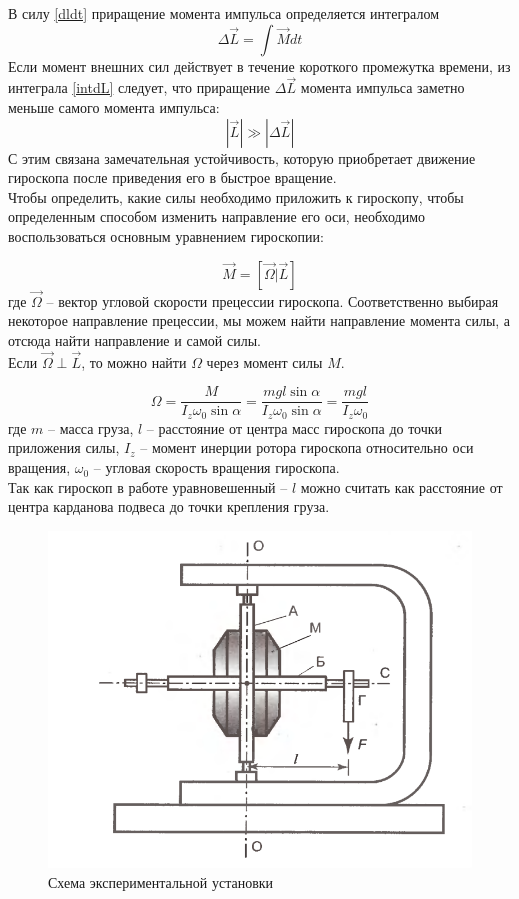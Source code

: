 \documentclass[a4paper,12pt]{article}
\begin{document}
	В силу \eqref{dldt} приращение момента импульса определяется интегралом
	\begin{equation}
		\label{intdL}
		\Delta\vec{L}=\int\vec{M}dt
	\end{equation}
	Если момент внешних сил действует в течение короткого промежутка времени, из интеграла \eqref{intdL} следует, что приращение $\Delta\vec{L}$ момента импульса заметно меньше самого момента импульса:
	\[
	|\vec{L}| \gg |\Delta\vec{L}|
	\]
	С этим связана замечательная устойчивость, которую приобретает движение гироскопа после приведения его в быстрое вращение.\\
	
	Чтобы определить, какие силы необходимо приложить к гироскопу, чтобы определенным способом изменить направление его оси, необходимо воспользоваться основным уравнением гироскопии:
	
	\begin{equation}
		\label{gyro}
		\vec{M}=[\vec{\Omega}|\vec{L}]
	\end{equation}
	где $\vec{\Omega}$ -- вектор угловой скорости прецессии гироскопа. Соответственно выбирая некоторое направление прецессии, мы можем найти направление момента силы, а отсюда найти направление и самой силы.\\
	
	Если $\vec{\Omega} \perp \vec{L}$, то можно найти $\Omega$ через момент силы $M$.
	
	\begin{equation}
		\label{Omega}
		\Omega=\frac{M}{I_z\omega_0\sin{\alpha}}=\frac{mgl\sin{\alpha}}{I_z\omega_0\sin{\alpha}}=\frac{mgl}{I_z\omega_0}
	\end{equation}
	где $m$ -- масса груза, $l$ -- расстояние от центра масс гироскопа до точки приложения силы, $I_z$ -- момент инерции ротора гироскопа относительно оси вращения, $\omega_0$ -- угловая скорость вращения гироскопа.\\
	
	Так как гироскоп в работе уравновешенный -- $l$ можно считать как расстояние от центра карданова подвеса до точки крепления груза.
	
	\begin{figure}
		\centering
		\includegraphics[width=0.7\linewidth]{fig1}
		\caption{Схема экспериментальной установки}
		\label{fig:fig1}
	\end{figure}
	
\end{document}
